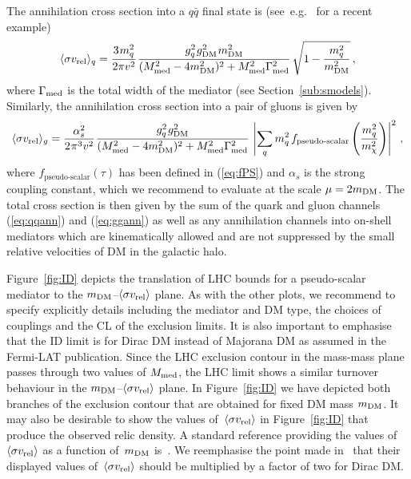 The annihilation  cross section into a $q \bar{q}$ final state is (see~e.g.~\cite{Buchmueller:2015eea} for a recent example)  
\begin{equation} \label{eq:qqann}
 \langle \sigma v_{\rm{rel}}\rangle_q =\frac{3 \hspace{0.25mm} m_q^2}{2 \pi v^2} \hspace{0.25mm} \frac{g_q^2  \hspace{0.25mm}  g_{\rm{DM}}^2  \hspace{0.25mm}  m_{\rm{DM}}^2}{(M_{\rm{med}}^2-4 m_{\rm{DM}}^2)^2+M_{\rm{med}}^2 \Gamma_{\rm med}^2} \, \sqrt{1-\frac{m_q^2}{m_{\rm{DM}}^2}}\,,
\end{equation}
where  $\Gamma_{\rm med}$ is the total width of the mediator (see  Section~\ref{sub:smodels}). Similarly, the annihilation  cross section into a pair of gluons is given by
\begin{equation} \label{eq:ggann}
\langle \sigma v_{\rm{rel}}\rangle_g =\frac{\alpha_s^2}{2 \hspace{0.25mm}  \pi^3 v^2}\hspace{0.25mm} \frac{g_q^2 \hspace{0.25mm} g_{\rm{DM}}^2}{(M_{\rm{med}}^2-4 m_{\rm{DM}}^2)^2+M_{\rm{med}}^2 \Gamma_{\rm med}^2} \, \left|\sum_q m_q^2 \hspace{0.5mm} f_\text{pseudo-scalar}\left(\frac{m_q^2}{m_\chi^2}\right)\right|^2\,,
\end{equation}
where $f_\text{pseudo-scalar} (\tau)$ 
has been defined in 
(\ref{eq:fPS}) and $\alpha_s$ is the strong coupling constant, which we recommend to evaluate at the scale $\mu = 2 m_{\rm{DM}}$. The  total cross section is then given by  the sum of the quark and gluon channels (\ref{eq:qqann}) and (\ref{eq:ggann}) as well as any annihilation channels into on-shell
mediators which are kinematically allowed and are not suppressed by the small relative velocities of DM in the galactic halo.

Figure~\ref{fig:ID} depicts the translation of  LHC bounds   for a pseudo-scalar mediator to the  $m_{\rm{DM}}$--$\langle \sigma v_{\rm{rel}} \rangle$ plane. As with the other plots, we recommend to specify explicitly details including the mediator and DM type, the choices of couplings and the CL of the exclusion limits. It is also important to emphasise that the  ID limit is for Dirac DM instead of Majorana DM as assumed in the Fermi-LAT publication.  Since the  LHC exclusion contour in the mass-mass plane passes through two values of $M_{\rm{med}}$,  the LHC limit shows a similar turnover behaviour in the  $m_{\rm{DM}}$--$\langle \sigma v_{\rm{rel}} \rangle$ plane.  In Figure~\ref{fig:ID} we have depicted both branches of the exclusion contour that are obtained for fixed DM mass $m_{\rm{DM}}$. 
It may also be desirable to show the values of~$\langle \sigma v_{\rm{rel}} \rangle$ in Figure~\ref{fig:ID} that produce the observed relic density.  A standard reference providing the values of~$\langle \sigma v_{\rm{rel}} \rangle$ as a function of~$m_{\rm{DM}}$ is~\cite{Steigman:2012nb}. We reemphasise the point made in~\cite{Steigman:2012nb} that their displayed values of~$\langle \sigma v_{\rm{rel}} \rangle$ should be multiplied by a factor of two for Dirac DM.

